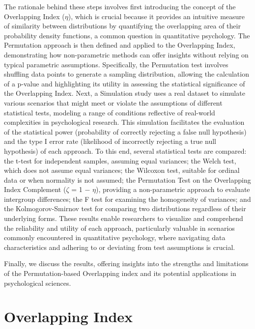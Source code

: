 \documentclass[twocolumn]{article}
\begin{document}
The rationale behind these steps involves first introducing the concept of the Overlapping Index ($\eta$), which is crucial because it provides an intuitive measure of similarity between distributions by quantifying the overlapping area of their probability density functions, a common question in quantitative psychology. The Permutation approach is then defined and applied to the Overlapping Index, demonstrating how non-parametric methods can offer insights without relying on typical parametric assumptions. Specifically, the Permutation test involves shuffling data points to generate a sampling distribution, allowing the calculation of a p-value and highlighting its utility in assessing the statistical significance of the Overlapping Index. Next, a Simulation study uses a real dataset to simulate various scenarios that might meet or violate the assumptions of different statistical tests, modeling a range of conditions reflective of real-world complexities in psychological research. This simulation facilitates the evaluation of the statistical power (probability of correctly rejecting a false null hypothesis) and the type I error rate (likelihood of incorrectly rejecting a true null hypothesis) of each approach. To this end, several statistical tests are compared: the t-test for independent samples, assuming equal variances; the Welch test, which does not assume equal variances; the Wilcoxon test, suitable for ordinal data or when normality is not assumed; the Permutation Test on the Overlapping Index Complement ($\zeta$ = 1 − $\eta$), providing a non-parametric approach to evaluate intergroup differences; the F test for examining the homogeneity of variances; and the Kolmogorov-Smirnov test for comparing two distributions regardless of their underlying forms. These results enable researchers to visualize and comprehend the reliability and utility of each approach, particularly valuable in scenarios commonly encountered in quantitative psychology, where navigating data characteristics and adhering to or deviating from test assumptions is crucial.

Finally, we discuss the results, offering insights into the strengths and limitations of the Permutation-based Overlapping index and its potential applications in psychological sciences.

\section{Overlapping Index}
\end{document}
